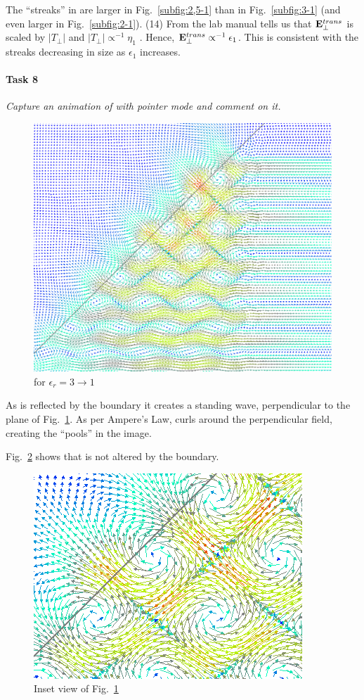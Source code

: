 The ``streaks'' in are larger in Fig.~\ref{subfig:2,5-1} than in Fig.~\ref{subfig:3-1} (and even larger in Fig.~\ref{subfig:2-1}).
(14) From the lab manual tells us that $\mathbf{E}^{trans}_{\perp}$ is scaled by $\left|T_{\perp}\right|$ and $\left|T_{\perp}\right| \propto^{-1} \eta_1$ \cite{lab-manual}.
Hence, $\mathbf{E}^{trans}_{\perp} \propto^{-1} \epsilon_1$.
This is consistent with the streaks decreasing in size as $\epsilon_1$ increases.

\pagebreak
\paragraph{Task 8}\textit{Capture an animation of  with pointer mode and comment on it.}

\begin{figure}[tbph]
	\centering
	\includegraphics[width=0.8\linewidth]{graphics/Task8-Pointers}
	\caption{ for $\epsilon_r = 3 \rightarrow 1$}
	\label{fig:Task8-Pointers}
\end{figure}

As  is reflected by the boundary it creates a standing wave, perpendicular to the plane of Fig.~\ref{fig:Task8-Pointers}.
As per Ampere's Law,  curls around the perpendicular  field, creating the ``pools'' in the image. 

Fig.~\ref{fig:Task8-Pointers-Inset} shows that  is not altered by the boundary.
\begin{figure}[tbph]
	\centering
	\includegraphics[width=0.4\linewidth]{graphics/Task8-Pointers-Inset}
	\caption{Inset view of Fig.~\ref{fig:Task8-Pointers}}
	\label{fig:Task8-Pointers-Inset}
\end{figure}


